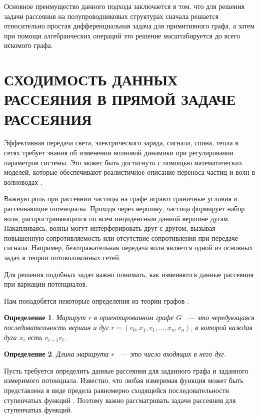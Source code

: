 \documentclass[a4 paper, 12 pt]{extarticle}
\newtheorem{Def}{Определение}[section]
\begin{document}
   Основное преимущество данного подхода заключается в том, что для решения задачи рассеяния на полупроводниковых структурах сначала решается относительно простая дифференциальная задача для примитивного графа, а затем при помощи алгебраических операций это решение масштабируется до всего искомого графа.
   
   \section{СХОДИМОСТЬ ДАННЫХ РАССЕЯНИЯ В ПРЯМОЙ ЗАДАЧЕ РАССЕЯНИЯ}
   
   Эффективная передача света, электрического заряда, сигнала, спина, тепла в сетях требует знания об изменении волновой динамики при регулировании параметров системы. Это может быть достигнуто с помощью математических моделей, которые обеспечивают реалистичное описание переноса частиц и волн в волноводах \cite{TransparentQuantumGraphs}.
   
   Важную роль при рассеянии частицы на графе играют граничные условия и рассеивающие потенциалы. Проходя через вершину, частица формирует набор волн, распространяющихся по всем инцидентным данной вершине дугам. Накапливаясь, волны могут интерферировать друг с другом, вызывая повышенную сопротивляемость или отсутствие сопротивления при передаче сигнала.
   Например, безотражательная передача волн является одной из основных задач в теории оптоволоконных сетей.
   
   Для решения подобных задач важно понимать, как изменяются данные рассеяния при вариации потенциалов.
   
   Нам понадобятся некоторые определения из теории графов \cite{Emelichev}:
   
   \begin{Def}
   	Маршрут $r$ в ориентированном графе $G$ ~--- это чередующаяся последовательность вершин и дуг $r = \left(v_0, x_1, v_1, \ldots, x_n, v_n\right)$, в которой каждая дуга $x_i$ есть $v_{i-1} v_i$.
   \end{Def}
   
   \begin{Def}
   	Длина маршрута $r$ ~--- это число входящих в него дуг.
   \end{Def}

   Пусть требуется определить данные рассеяния для заданного графа и заданного измеримого потенциала. Известно, что любая измеримая функция может быть представлена в виде предела равномерно сходящейся последовательности ступенчатых функций \cite{Kolmogorov}. Поэтому важно рассматривать задачи рассеяния для ступенчатых функций.
   
\end{document}
